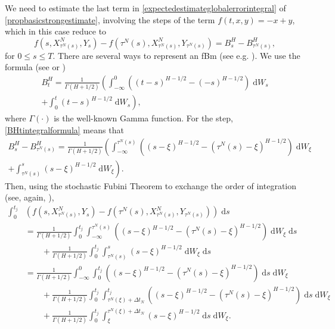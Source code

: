 \documentclass[reqno,12pt]{amsart}
\theoremstyle{plain} %
\theoremstyle{definition} %
\begin{document}
We need to estimate the last term in \cref{expectedestimateglobalerrorintegral} of \cref{propbasicstrongestimate}, involving the steps of the term $f(t, x, y) = -x + y$, which in this case reduce to
\begin{equation}
    \label{stepfBm}
    f(s, X_{\tau^N(s)}^N, Y_s) - f(\tau^N(s), X_{\tau^N(s)}^N, Y_{\tau^N(s)}) = B^H_s - B^H_{\tau^N(s)},
\end{equation}
for $0 \leq s \leq T$. There are several ways to represent an fBm (see e.g. \cite{BHOB2008, Mishura2008}). We use the formula (see \cite[eq. (2.1)]{MandelbrotVanNess1968} or \cite[eq. (1.1)]{BHOB2008})
\begin{multline}
    \label{BHtintegralformula}
    B^H_t = \frac{1}{\Gamma(H + 1/2)}\left(\int_{-\infty}^0 \left( (t-s)^{H-1/2} - (-s)^{H-1/2}\right) \;\mathrm{d}W_s \right. \\
    \left. + \int_0^t (t - s)^{H-1/2} \;\mathrm{d}W_s\right),
\end{multline}
where $\Gamma(\cdot)$ is the well-known Gamma function. For the step, \cref{BHtintegralformula} means that
\begin{multline}
    \label{BHtintegralformulastep}
    B^H_s - B^H_{\tau^N(s)} = \frac{1}{\Gamma(H + 1/2)}\left(\int_{-\infty}^{\tau^N(s)} \left( (s-\xi)^{H-1/2} - (\tau^N(s)-\xi)^{H-1/2}\right) \;\mathrm{d}W_\xi \right. \\
    \left. + \int_{\tau^N(s)}^s (s - \xi)^{H-1/2} \;\mathrm{d}W_\xi\right).
\end{multline}
Then, using the stochastic Fubini Theorem to exchange the order of integration (see, again, \cite[Section IV.6]{Protter2005}),
\begin{equation}
    \label{integralofstepfBm}
    \begin{aligned}
        \int_0^{t_j} & \left( f(s, X_{\tau^N(s)}^N, Y_s) - f(\tau^N(s), X_{\tau^N(s)}^N, Y_{\tau^N(s)}) \right)\;\mathrm{d}s \\
        & = \frac{1}{\Gamma(H + 1/2)}\int_0^{t_j} \int_{-\infty}^{\tau^N(s)} \left( (s-\xi)^{H-1/2} - (\tau^N(s)-\xi)^{H-1/2}\right) \;\mathrm{d}W_\xi \;\mathrm{d}s \\
        & \qquad + \frac{1}{\Gamma(H + 1/2)}\int_0^{t_j} \int_{\tau^N(s)}^s (s - \xi)^{H-1/2} \;\mathrm{d}W_\xi \;\mathrm{d}s \\
        & = \frac{1}{\Gamma(H + 1/2)}\int_{-\infty}^{0} \int_{0}^{t_j} \left( (s-\xi)^{H-1/2} - (\tau^N(s)-\xi)^{H-1/2}\right) \;\mathrm{d}s \;\mathrm{d}W_\xi \\
        & \qquad + \frac{1}{\Gamma(H + 1/2)}\int_{0}^{t_j} \int_{\tau^N(\xi)+\Delta t_N}^{t_j} \left( (s-\xi)^{H-1/2} - (\tau^N(s)-\xi)^{H-1/2}\right)  \;\mathrm{d}s \;\mathrm{d}W_\xi\\
        & \qquad + \frac{1}{\Gamma(H + 1/2)}\int_0^{t_j} \int_\xi^{\tau^N(\xi) + \Delta t_N} (s - \xi)^{H-1/2} \;\mathrm{d}s \;\mathrm{d}W_\xi. \\
    \end{aligned}
\end{equation}
\end{document}

